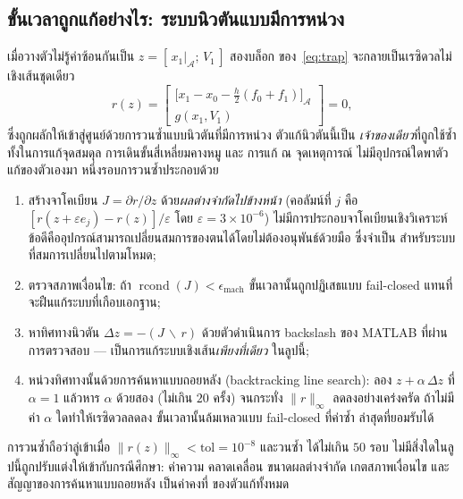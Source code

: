 \documentclass[12pt,a4paper]{article}
\begin{document}
\subsection{ขั้นเวลาถูกแก้อย่างไร: ระบบนิวตันแบบมีการหน่วง}\label{sec:ts-newton}
เมื่อวางตัวไม่รู้ค่าซ้อนกันเป็น $z=[\,x_1|_{\mathcal{A}};\,V_1\,]$ สองบล็อก
ของ~\eqref{eq:trap} จะกลายเป็นเรซิดวลไม่เชิงเส้นชุดเดียว
\begin{equation}
  r(z)=\begin{bmatrix} \bigl[x_1-x_0-\tfrac{h}{2}(f_0+f_1)\bigr]_{\mathcal{A}}\\[2pt]
       g(x_1,V_1)\end{bmatrix}=0,
  \label{eq:resid}
\end{equation}
ซึ่งถูกผลักให้เข้าสู่ศูนย์ด้วยการวนซ้ำแบบนิวตันที่มีการหน่วง ตัวแก้นิวตันนี้เป็น
\emph{เจ้าของเดียว}ที่ถูกใช้ซ้ำทั้งในการแก้จุดสมดุล การเดินขั้นสี่เหลี่ยมคางหมู และ
การแก้ ณ จุดเหตุการณ์ ไม่มีอุปกรณ์ใดพาตัวแก้ของตัวเองมา หนึ่งรอบการวนซ้ำประกอบด้วย
\begin{enumerate}\itemsep2pt
  \item สร้างจาโคเบียน $J=\partial r/\partial z$ ด้วย\emph{ผลต่างจำกัดไปข้างหน้า}
        (คอลัมน์ที่ $j$ คือ $[r(z+\varepsilon e_j)-r(z)]/\varepsilon$ โดย
        $\varepsilon=3\times10^{-6}$) ไม่มีการประกอบจาโคเบียนเชิงวิเคราะห์
        ข้อดีคืออุปกรณ์สามารถเปลี่ยนสมการของตนได้โดยไม่ต้องอนุพันธ์ด้วยมือ ซึ่งจำเป็น
        สำหรับระบบที่สมการเปลี่ยนไปตามโหมด;
  \item ตรวจสภาพเงื่อนไข: ถ้า $\operatorname{rcond}(J)<\epsilon_{\mathrm{mach}}$
        ขั้นเวลานั้นถูกปฏิเสธแบบ fail-closed แทนที่จะฝืนแก้ระบบที่เกือบเอกฐาน;
  \item หาทิศทางนิวตัน $\Delta z=-(J\,\backslash\,r)$ ด้วยตัวดำเนินการ backslash
        ของ MATLAB ที่ผ่านการตรวจสอบ --- เป็นการแก้ระบบเชิงเส้น\emph{เพียงที่เดียว}
        ในลูปนี้;
  \item หน่วงทิศทางนั้นด้วยการค้นหาแบบถอยหลัง (backtracking line search): ลอง
        $z+\alpha\,\Delta z$ ที่ $\alpha=1$ แล้วหาร $\alpha$ ด้วยสอง (ไม่เกิน $20$
        ครั้ง) จนกระทั่ง $\lVert r\rVert_\infty$ ลดลงอย่างเคร่งครัด ถ้าไม่มีค่า
        $\alpha$ ใดทำให้เรซิดวลลดลง ขั้นเวลานั้นล้มเหลวแบบ fail-closed ที่ค่าซ้ำ
        ล่าสุดที่ยอมรับได้
\end{enumerate}
การวนซ้ำถือว่าลู่เข้าเมื่อ $\lVert r(z)\rVert_\infty<\mathrm{tol}=10^{-8}$ และวนซ้ำ
ได้ไม่เกิน $50$ รอบ ไม่มีสิ่งใดในลูปนี้ถูกปรับแต่งให้เข้ากับกรณีศึกษา: ค่าความ
คลาดเคลื่อน ขนาดผลต่างจำกัด เกตสภาพเงื่อนไข และสัญญาของการค้นหาแบบถอยหลัง เป็นค่าคงที่
ของตัวแก้ทั้งหมด
\end{document}
